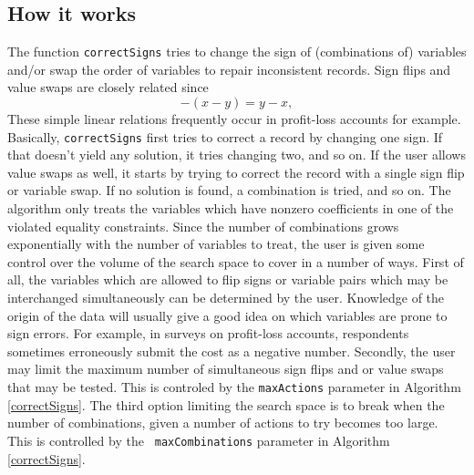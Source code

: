 \documentclass[11pt, fleqn, a4paper]{article}
\begin{document}
\subsection{How it works}
The function {\tt correctSigns} tries to change the sign of (combinations of)
variables and/or swap the order of variables to repair inconsistent records.
Sign flips and value swaps are closely related since
\begin{equation}
-(x - y) = y - x,
\end{equation}
These simple linear relations frequently occur in profit-loss accounts for
example.  Basically, {\tt correctSigns} first tries to correct a record by
changing one sign. If that doesn't yield any solution, it tries changing two,
and so on. If the user allows value swaps as well, it starts by trying to
correct the record with a single sign flip or variable swap. If no solution is
found, a combination is tried, and so on. The algorithm only treats the
variables which have nonzero coefficients in one of the violated equality
constraints.  Since the number of combinations grows
exponentially with the number of variables to treat, the user is given some
control over the volume of the search space to cover in a number of ways. First
of all, the variables which are allowed to flip signs or variable pairs which
may be interchanged simultaneously can be determined by the user. Knowledge of
the origin of the data will usually give a good idea on which variables are
prone to sign errors.  For example, in surveys on profit-loss accounts,
respondents sometimes erroneously submit the cost as a negative number.
Secondly, the user may limit the maximum number of simultaneous sign flips and
or value swaps that may be tested. This is controled by the {\tt maxActions}
parameter in Algorithm \ref{correctSigns}.  The third option limiting the
search space is to break when the number of combinations, given a number of
actions to try becomes too large. This is controlled by the {\tt
maxCombinations} parameter in Algorithm
\ref{correctSigns}.
%
%
\end{document}
